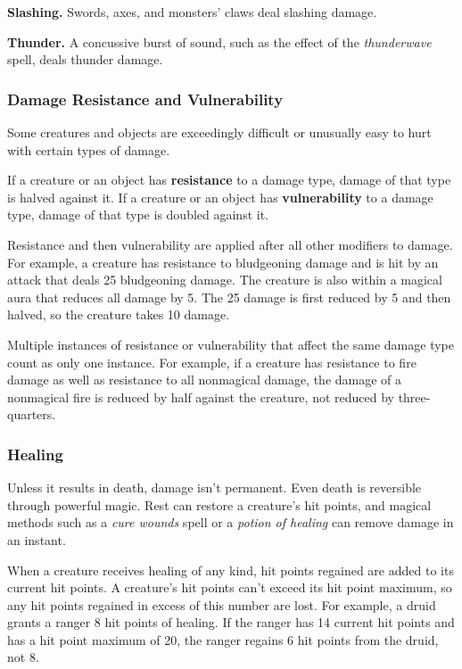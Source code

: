 \documentclass[
]{article}
\begin{document}
\textbf{Slashing.} Swords, axes, and monsters' claws deal slashing
damage.

\textbf{Thunder.} A concussive burst of sound, such as the effect of the
\emph{thunderwave} spell, deals thunder damage.

\hypertarget{damage-resistance-and-vulnerability}{%
\subsubsection{Damage Resistance and
Vulnerability}\label{damage-resistance-and-vulnerability}}

Some creatures and objects are exceedingly difficult or unusually easy
to hurt with certain types of damage.

If a creature or an object has \textbf{resistance} to a damage type,
damage of that type is halved against it. If a creature or an object has
\textbf{vulnerability} to a damage type, damage of that type is doubled
against it.

Resistance and then vulnerability are applied after all other modifiers
to damage. For example, a creature has resistance to bludgeoning damage
and is hit by an attack that deals 25 bludgeoning damage. The creature
is also within a magical aura that reduces all damage by 5. The 25
damage is first reduced by 5 and then halved, so the creature takes 10
damage.

Multiple instances of resistance or vulnerability that affect the same
damage type count as only one instance. For example, if a creature has
resistance to fire damage as well as resistance to all nonmagical
damage, the damage of a nonmagical fire is reduced by half against the
creature, not reduced by three- quarters.

\hypertarget{healing}{%
\subsubsection{Healing}\label{healing}}

Unless it results in death, damage isn't permanent. Even death is
reversible through powerful magic. Rest can restore a creature's hit
points, and magical methods such as a \emph{cure wounds} spell or a
\emph{potion of healing} can remove damage in an instant.

When a creature receives healing of any kind, hit points regained are
added to its current hit points. A creature's hit points can't exceed
its hit point maximum, so any hit points regained in excess of this
number are lost. For example, a druid grants a ranger 8 hit points of
healing. If the ranger has 14 current hit points and has a hit point
maximum of 20, the ranger regains 6 hit points from the druid, not 8.
\end{document}
